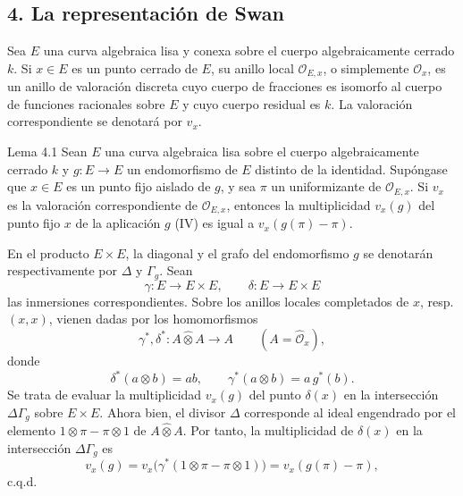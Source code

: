 \subsection*{4. La representación de Swan}

Sea $E$ una curva algebraica lisa y conexa sobre el cuerpo algebraicamente cerrado $k$. Si $x\in E$ es un punto cerrado de $E$, su anillo local $\mathcal O_{E,x}$, o simplemente $\mathcal O_x$, es un anillo de valoración discreta cuyo cuerpo de fracciones es isomorfo al cuerpo de funciones racionales sobre $E$ y cuyo cuerpo residual es $k$. La valoración correspondiente se denotará por $v_x$.

\begin{statement}{Lema 4.1}
Sean $E$ una curva algebraica lisa sobre el cuerpo algebraicamente cerrado $k$ y $g:E\to E$ un endomorfismo de $E$ distinto de la identidad. Supóngase que $x\in E$ es un punto fijo aislado de $g$, y sea $\pi$ un uniformizante de $\mathcal O_{E,x}$. Si $v_x$ es la valoración correspondiente de $\mathcal O_{E,x}$, entonces la multiplicidad $v_x(g)$ del punto fijo $x$ de la aplicación $g$ (IV) es igual a $v_x(g(\pi)-\pi)$.
\end{statement}


En el producto $E\times E$, la diagonal y el grafo del endomorfismo $g$ se denotarán respectivamente por $\Delta$ y $\Gamma_g$. Sean
\[
\gamma:E\longrightarrow E\times E,\qquad
\delta:E\longrightarrow E\times E
\]
las inmersiones correspondientes. Sobre los anillos locales completados de $x$, resp. $(x,x)$, vienen dadas por los homomorfismos
\[
\gamma^*,\delta^*:A\widehat\otimes A\longrightarrow A
\qquad (A=\widehat{\mathcal O}_x),
\]
donde
\[
\delta^*(a\otimes b)=ab,\qquad
\gamma^*(a\otimes b)=a\,g^*(b).
\]
Se trata de evaluar la multiplicidad $v_x(g)$ del punto $\delta(x)$ en la intersección $\Delta\Gamma_g$ sobre $E\times E$. Ahora bien, el divisor $\Delta$ corresponde al ideal engendrado por el elemento $1\otimes\pi-\pi\otimes1$ de $A\widehat\otimes A$. Por tanto, la multiplicidad de $\delta(x)$ en la intersección $\Delta\Gamma_g$ es
\[
v_x(g)=v_x\bigl(\gamma^*(1\otimes\pi-\pi\otimes1)\bigr)
      =v_x(g(\pi)-\pi),
\]
c.q.d.
